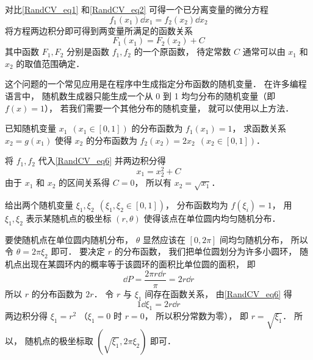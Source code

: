 对比\autoref{RandCV_eq1} 和\autoref{RandCV_eq2} 可得一个已分离变量的微分方程
\begin{equation}\label{RandCV_eq6}
f_1(x_1)\dd{x_1} = f_2(x_2)\dd{x_2}
\end{equation}
将方程两边积分即可得到两变量所满足的函数关系
\begin{equation}
F_1(x_1) = F_2(x_2) + C
\end{equation}
其中函数 $F_1, F_2$ 分别是函数 $f_1, f_2$ 的一个原函数， 待定常数 $C$ 通常可以由 $x_1$ 和 $x_2$ 的取值范围确定．

这个问题的一个常见应用是在程序中生成指定分布函数的随机变量． 在许多编程语言中， 随机数生成器只能生成一个从 0 到 1 均匀分布的随机变量（即 $f(x) = 1$）， 若我们需要一个其他分布的随机变量， 就可以使用以上方法．

\begin{example}{}
已知随机变量 $x_1\ \ (x_1\in [0,1])$ 的分布函数为 $f_1(x_1) = 1$， 求函数关系 $x_2 = g(x_1)$ 使得 $x_2$ 的分布函数为 $f_2(x_2) = 2x_2\ \ (x_2\in [0,1])$．

将 $f_1, f_2$ 代入\autoref{RandCV_eq6} 并两边积分得
\begin{equation}
x_1 = x_2^2 + C
\end{equation}
由于 $x_1$ 和 $x_2$ 的区间关系得 $C = 0$， 所以有 $x_2 = \sqrt{x_1}$．
\end{example}

\begin{example}{}\label{RandCV_ex3}
给出两个随机变量 $\xi_1, \xi_2\ \ (\xi_1, \xi_2\in [0,1])$， 分布函数均为 $f(\xi_i) = 1$， 用 $\xi_1, \xi_2$ 表示某随机点的极坐标 $(r,\theta)$ 使得该点在单位圆内均匀随机分布．

要使随机点在单位圆内随机分布， $\theta$ 显然应该在 $[0,2\pi]$ 间均匀随机分布， 所以令 $\theta = 2\pi\xi_2$ 即可． 要决定 $r$ 的分布函数， 我们把单位圆划分为许多小圆环， 随机点出现在某圆环内的概率等于该圆环的面积比单位圆的面积， 即
\begin{equation}
\dd{P} = \frac{2\pi r\dd{r}}{\pi} = 2r\dd{r}
\end{equation}
所以 $r$ 的分布函数为 $2r$． 令 $r$ 与 $\xi_1$ 间存在函数关系， 由\autoref{RandCV_eq6} 得
\begin{equation}
1\dd{\xi_1} = 2r\dd{r}
\end{equation}
两边积分得 $\xi_1 = r^2$ （$\xi_1 = 0$ 时 $r = 0$， 所以积分常数为零）， 即 $r = \sqrt{\xi_1}$． 所以， 随机点的极坐标取 $(\sqrt{\xi_1}, 2\pi \xi_2)$ 即可．
\end{example}
